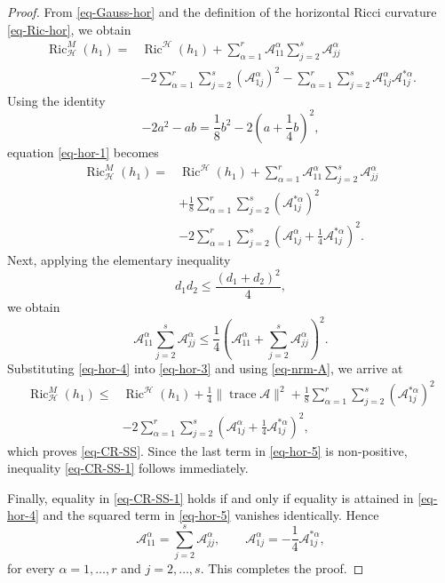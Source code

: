 \documentclass[10pt,a4paper]{amsart}
\begin{document}
\begin{proof}
From \eqref{eq-Gauss-hor} and the definition of the horizontal Ricci
curvature \eqref{eq-Ric-hor}, we obtain
\begin{align}
\operatorname{Ric}_{\mathcal H}^{M}(h_{1})
={}&
\operatorname{Ric}^{\mathcal H}(h_{1})
+\sum_{\alpha=1}^{r}
\mathcal A_{11}^{\alpha}
\sum_{j=2}^{s}\mathcal A_{jj}^{\alpha}
\nonumber\\
&-2\sum_{\alpha=1}^{r}\sum_{j=2}^{s}
(\mathcal A_{1j}^{\alpha})^{2}
-\sum_{\alpha=1}^{r}\sum_{j=2}^{s}
\mathcal A_{1j}^{\alpha}\mathcal A_{1j}^{*\alpha}.
\label{eq-hor-1}
\end{align}
Using the identity
\[
-2a^{2}-ab
=
\frac18b^{2}
-2\left(a+\frac14b\right)^{2},
\]
equation \eqref{eq-hor-1} becomes
\begin{align}
\operatorname{Ric}_{\mathcal H}^{M}(h_{1})
={}&
\operatorname{Ric}^{\mathcal H}(h_{1})
+\sum_{\alpha=1}^{r}
\mathcal A_{11}^{\alpha}
\sum_{j=2}^{s}\mathcal A_{jj}^{\alpha}
\nonumber\\
&+\frac18\sum_{\alpha=1}^{r}\sum_{j=2}^{s}
(\mathcal A_{1j}^{*\alpha})^{2}
\nonumber\\
&-2\sum_{\alpha=1}^{r}\sum_{j=2}^{s}
\left(
\mathcal A_{1j}^{\alpha}
+\frac14\mathcal A_{1j}^{*\alpha}
\right)^{2}.
\label{eq-hor-3}
\end{align}
Next, applying the elementary inequality
\[
d_{1}d_{2}
\leq
\frac{(d_{1}+d_{2})^{2}}{4},
\]
we obtain
\begin{equation}
\mathcal A_{11}^{\alpha}
\sum_{j=2}^{s}\mathcal A_{jj}^{\alpha}
\leq
\frac14
\left(
\mathcal A_{11}^{\alpha}
+\sum_{j=2}^{s}\mathcal A_{jj}^{\alpha}
\right)^{2}.
\label{eq-hor-4}
\end{equation}
Substituting \eqref{eq-hor-4} into \eqref{eq-hor-3} and using
\eqref{eq-nrm-A}, we arrive at
\begin{align}
\operatorname{Ric}_{\mathcal H}^{M}(h_{1})
\leq{}&
\operatorname{Ric}^{\mathcal H}(h_{1})
+\frac14\|\operatorname{trace}\mathcal A\|^{2}
+\frac18\sum_{\alpha=1}^{r}\sum_{j=2}^{s}
(\mathcal A_{1j}^{*\alpha})^{2}
\nonumber\\
&-2\sum_{\alpha=1}^{r}\sum_{j=2}^{s}
\left(
\mathcal A_{1j}^{\alpha}
+\frac14\mathcal A_{1j}^{*\alpha}
\right)^{2},
\label{eq-hor-5}
\end{align}
which proves \eqref{eq-CR-SS}. Since the last term in \eqref{eq-hor-5} is non-positive, inequality
\eqref{eq-CR-SS-1} follows immediately.

Finally, equality in \eqref{eq-CR-SS-1} holds if and only if equality is
attained in \eqref{eq-hor-4} and the squared term in
\eqref{eq-hor-5} vanishes identically. Hence
\[
\mathcal A_{11}^{\alpha}
=
\sum_{j=2}^{s}\mathcal A_{jj}^{\alpha},
\qquad
\mathcal A_{1j}^{\alpha}
=
-\frac14\mathcal A_{1j}^{*\alpha},
\]
for every $\alpha=1,\ldots,r$ and $j=2,\ldots,s$. This completes the
proof.
\end{proof}
\end{document}
